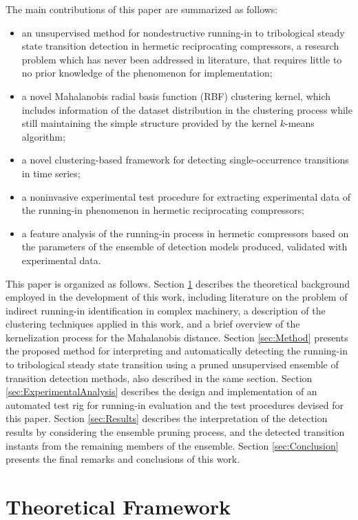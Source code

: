 \documentclass[preprint,11pt,number]{elsarticle}
\begin{document}
The main contributions of this paper are summarized as follows:
%
\begin{itemize}
    \item an unsupervised method for nondestructive running-in to tribological steady state transition detection in hermetic reciprocating compressors, a research problem which has never been addressed in literature, that requires little to no prior knowledge of the phenomenon for implementation;
    \item a novel Mahalanobis radial basis function (RBF) clustering kernel, which includes information of the dataset distribution in the clustering process while still maintaining the simple structure provided by the kernel $k$-means algorithm;
    \item a novel clustering-based framework for detecting single-occurrence transitions in time series;
    \item a noninvasive experimental test procedure for extracting experimental data of the running-in phenomenon in hermetic reciprocating compressors;
    \item a feature analysis of the running-in process in hermetic compressors based on the parameters of the ensemble of detection models produced, validated with experimental data.
\end{itemize}

This paper is organized as follows. Section \ref{sec:TheoreticalFramework} describes the theoretical background employed in the development of this work, including literature on the problem of indirect running-in identification in complex machinery, a description of the clustering techniques applied in this work, and a brief overview of the kernelization process for the Mahalanobis distance. Section \ref{sec:Method} presents the proposed method for interpreting and automatically detecting the running-in to tribological steady state transition using a pruned unsupervised ensemble of transition detection methods, also described in the same section. Section \ref{sec:ExperimentalAnalysis} describes the design and implementation of an automated test rig for running-in evaluation and the test procedures devised for this paper. Section \ref{sec:Results} describes the interpretation of the detection results by considering the ensemble pruning process, and the detected transition instants from the remaining members of the ensemble. Section \ref{sec:Conclusion} presents the final remarks and conclusions of this work.

\section{Theoretical Framework}\label{sec:TheoreticalFramework}
\end{document}
